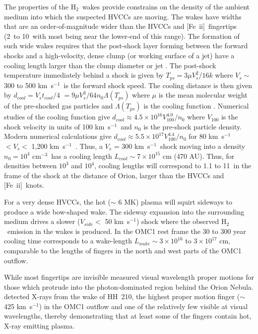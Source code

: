 \documentclass[12pt,preprint]{aastex}
\newcommand{\cmq}{cm{$^{-3}$}}
\newcommand{\kms}{km~s{$^{-1}$}}
\newcommand{\Feii}{[Fe~{\sc ii}]}
\newcommand{\hh}{\ensuremath{\textrm{H}_{2}}}			%
\begin{document}
The  properties of the \hh\  wakes provide constrains on the density of the ambient 
medium into which the suspected HVCCs are moving.   The wakes have widths that are 
an order-of-magnitude wider than the HVCCs and \Feii\  fingertips (2\arcsec\ to 10\arcsec\ 
with most being near the lower-end of this range).   The formation of such wide wakes requires 
that the post-shock layer forming between the forward shocks and a high-velocity,  dense 
clump  (or working surface of a jet) have a cooling length larger than the clump diameter or 
jet \citep{Blondin1990}.      The post-shock temperature immediately behind a shock is 
given by $T_{ps} = 3 \mu V_s^2/ 16 k$ where $V_s \sim $ 300 to 500 \kms\  is the forward 
shock speed.  The cooling distance is then given by $d_{cool} = V_s t_{cool} / 4$
$= 9 \mu V_s^3 / 64 n_0 \Lambda (T_{ps})$ where $\mu$ is the mean molecular weight of
the pre-shocked gas particles and $\Lambda (T_{ps})$ is the cooling function
\citep{Blondin1990}.    Numerical studies of the cooling function give
$d_{cool} \approx 4.5 \times 10^{16} V_{100}^{4.0} / n_0$  where $V_{100}$ is the
shock velocity in units of 100 \kms\ and $n_0$ is the pre-shock particle density.   
Modern numerical calculations give 
$d_{cool} \approx 5.5 \times 10^{17} V_{100}^{4.4} / n_0$  for $80$ \kms\
$< V_s <$ 1,200 \kms\ \citep{Draine2011}.  Thus, a $V_s$ = 300 \kms\ shock
moving into a density $n_0 = 10^4$ \cmq\ has a cooling length 
$L_{cool} \sim 7 \times 10^{15}$ cm (470 AU).  Thus, for densities between $10^3$ and
$10^4$, cooling lengths will correspond to 1.1  to 11\arcsec\ in the frame of the shock 
at the distance of Orion, larger than the HVCCs and \Feii\  knots.

For a very dense HVCCs, the hot ($\sim$ 6 MK) plasma will squirt sideways to produce a wide
bow-shaped wake.   The sideway expansion into the surrounding medium drives a slower
($V_{side} < $ 50 \kms ) shock where the observed \hh\ emission in the wakes is produced.
In the OMC1 rest frame the 30 to 300 year cooling time corresponds to a wake-length 
$L_{wake} \sim 3 \times 10^{16}$ to $3 \times 10^{17}$ cm, comparable to the lengths of
fingers in the north and west parts of the OMC1 outflow.

While most fingertips are invisible \citet{Doi2002}  measured visual
wavelength proper motions for those which protrude into the photon-dominated region
behind the Orion Nebula.  
\citet{Grosso2006} detected X-rays from the wake of  HH~210, the highest proper motion
finger ($\sim$ 425 \kms ) in the OMC1 outflow and one of the relatively few visible at visual 
wavelengths, thereby demonstrating that at least some of the fingers contain hot,  X-ray 
emitting plasma.
\end{document}
